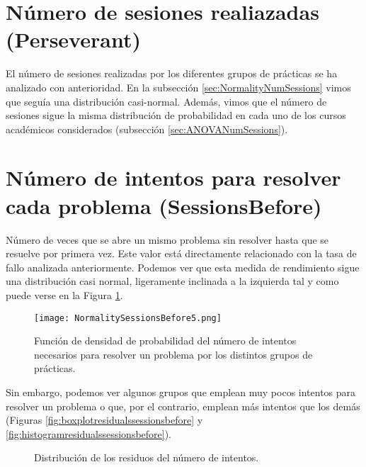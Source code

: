 \section{Número de sesiones realiazadas (Perseverant)}

El número de sesiones realizadas por los diferentes grupos de prácticas se ha analizado con anterioridad. En la subsección \ref{sec:NormalityNumSessions} vimos que seguía una distribución casi-normal. Además, vimos que el número de sesiones sigue la misma distribución de probabilidad en cada uno de los cursos académicos considerados (subsección \ref{sec:ANOVANumSessions}).

\section{Número de intentos para resolver cada problema (SessionsBefore)}

Número de veces que se abre un mismo problema sin resolver hasta que se resuelve por primera vez. Este valor está directamente relacionado con la tasa de fallo analizada anteriormente. Podemos ver que esta medida de rendimiento sigue una distribución casi normal, ligeramente inclinada a la izquierda tal y como puede verse en la Figura \ref{fig:densityplotsessionsbefore}.

\begin{figure}[H]
    \centering
    \texttt{[image: NormalitySessionsBefore5.png]}
    \caption{Función de densidad de probabilidad del número de intentos necesarios para resolver un problema por los distintos grupos de prácticas.}
    \label{fig:densityplotsessionsbefore}
\end{figure}

Sin embargo, podemos ver algunos grupos que emplean muy pocos intentos para resolver un problema o que, por el contrario, emplean más intentos que los demás (Figuras \ref{fig:boxplotresidualssessionsbefore} y \ref{fig:histogramresidualssessionsbefore}).

\begin{figure}[H]
\centering
{}\qquad
{}
\caption{Distribución de los residuos del número de intentos.}
\label{fig:achiever}
\end{figure}

